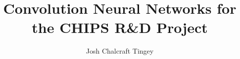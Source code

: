 \documentclass[hyperpdf,bindnopdf]{hepthesis}  %
\title{Convolution Neural Networks for the CHIPS R\&D Project}
\author{Josh Chalcraft Tingey}
\begin{document}

%    

\begin{mainmatter}
    
\end{mainmatter}

%    

\begin{backmatter}
    
\end{backmatter}
\end{document}
